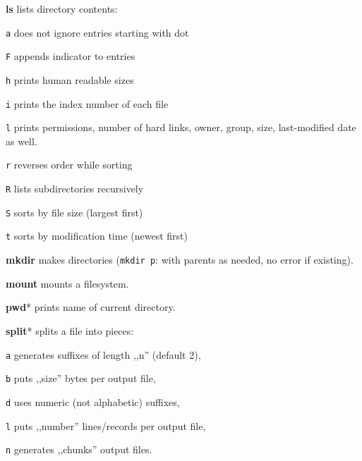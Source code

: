 \manualbreak

\begin{enumx}
	\item [\cmd] \textbf{ls} lists directory contents:
	\item [\texttt{a}] does not ignore entries starting with dot
	\item [\texttt{F}] appends indicator to entries
	\item [\texttt{h}] prints human readable sizes
	\item [\texttt{i}] prints the index number of each file
	\item [\texttt{l}] prints permissions, number of hard links, owner, group, size, last-modified date as well.
	\item [\texttt{r}] reverses order while sorting
	\item [\texttt{R}] lists subdirectories recursively
	\item [\texttt{S}] sorts by file size (largest first)
	\item [\texttt{t}] sorts by modification time (newest first)
\end{enumx}

\begin{enumx}
	\item [\cmd] \textbf{mkdir} makes directories (\texttt{mkdir p}: with parents as needed, no error if existing).
\end{enumx}

\begin{enumx}
	\item [\cmd] \textbf{mount} mounts a filesystem.
\end{enumx}

\begin{enumx}
	\item [\cmd] \textbf{pwd}* prints name of current directory.
\end{enumx}


\begin{enumx}
	\item [\cmd] \textbf{split}* splits a file into pieces:
	\item [\texttt{a}] generates suffixes of length ,,n'' (default 2),
	\item [\texttt{b}] puts ,,size'' bytes per output file,
	\item [\texttt{d}] uses numeric (not alphabetic) suffixes,
	\item [\texttt{l}] puts ,,number'' lines/records per output file,
	\item [\texttt{n}] generates ,,chunks'' output files.
\end{enumx}

